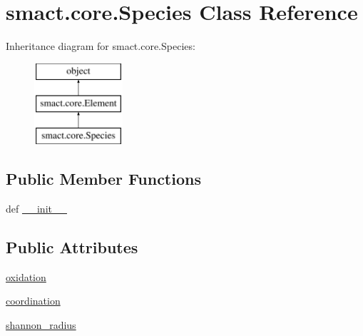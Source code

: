 \hypertarget{classsmact_1_1core_1_1_species}{}\section{smact.\+core.\+Species Class Reference}
\label{classsmact_1_1core_1_1_species}
Inheritance diagram for smact.\+core.\+Species\+:\begin{figure}[H]
\begin{center}
\leavevmode
\includegraphics[height=3.000000cm]{classsmact_1_1core_1_1_species}
\end{center}
\end{figure}
\subsection*{Public Member Functions}
\begin{DoxyCompactItemize}
\item 
def \hyperlink{classsmact_1_1core_1_1_species_a186239ed056e1ff2a5c26c29d2fd87ff}{\+\_\+\+\_\+init\+\_\+\+\_\+}
\end{DoxyCompactItemize}
\subsection*{Public Attributes}
\begin{DoxyCompactItemize}
\item 
\hyperlink{classsmact_1_1core_1_1_species_aa7e923db8eba011ccd5cbf7da36707ec}{oxidation}
\item 
\hyperlink{classsmact_1_1core_1_1_species_a4e9691114a02162516af95d4974f1541}{coordination}
\item 
\hyperlink{classsmact_1_1core_1_1_species_a4b07462f361429921475d57e057cdd2b}{shannon\+\_\+radius}
\end{DoxyCompactItemize}


